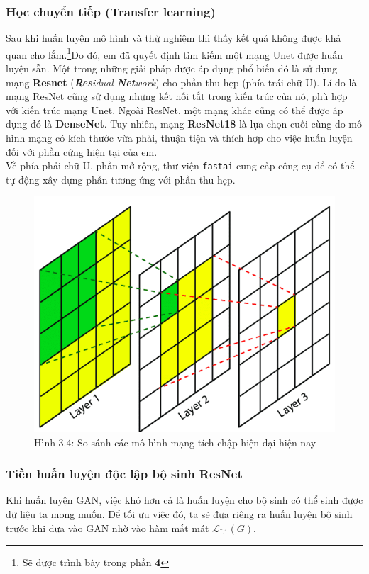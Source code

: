 \documentclass[a4paper]{article}
\begin{document}
\subsubsection{Học chuyển tiếp (Transfer learning)}
Sau khi huấn luyện mô hình và thử nghiệm thì thấy kết quả không được khả quan cho lắm.\footnote{Sẽ được trình bày trong phần \textbf{4 }}Do đó, em đã quyết định tìm kiếm một mạng Unet được huấn luyện sẵn. Một trong những giải pháp được áp dụng phổ biến đó là sử dụng mạng \textbf{Resnet} (\textit{\textbf{Res}idual \textbf{Net}work}) cho phần thu hẹp (phía trái chữ U). Lí do là mạng ResNet cũng sử dụng những kết nối tắt trong kiến trúc của nó, phù hợp với kiến trúc mạng Unet. Ngoài ResNet, một mạng khác cũng có thể được áp dụng đó là \textbf{DenseNet}. Tuy nhiên, mạng \textbf{ResNet18} là lựa chọn cuối cùng do mô hình mạng có kích thước vừa phải, thuận tiện và thích hợp cho việc huấn luyện đối với phần cứng hiện tại của em.\\
Về phía phải chữ U, phần mở rộng, thư viện \texttt{fastai} cung cấp công cụ để có thể tự động xây dựng phần tương ứng với phần thu hẹp.

\begin{figure}[h!]
\centering
\includegraphics[width=16cm]{images/3_4.png}
\caption{Hình 3.4: So sánh các mô hình mạng tích chập hiện đại hiện nay}
\end{figure}

\subsubsection{Tiền huấn luyện độc lập bộ sinh ResNet}
Khi huấn luyện GAN, việc khó hơn cả là huấn luyện cho bộ sinh có thể sinh được dữ liệu ta mong muốn. Để tối ưu việc đó, ta sẽ đưa riêng ra huấn luyện bộ sinh trước khi đưa vào GAN nhờ vào hàm mất mát $\mathcal{L}_{\text{L1}}(G)$.\\
\end{document}
